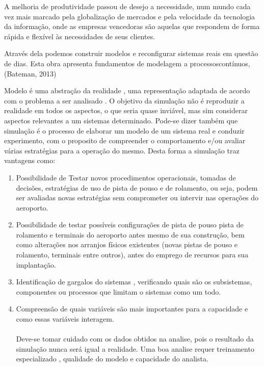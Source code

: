 \documentclass[12pt]{article}
\begin{document}
A melhoria de produtividade passou de desejo a necessidade, num mundo 
cada vez mais marcado pela globalização de mercados e pela velocidade
da tecnologia da informação, onde as empresas vencedoras são aquelas
que respondem de forma rápida e flexível às necessidades de seus clientes. 


Através dela podemos construir modelos e reconfigurar sistemas
reais em questão de dias. Esta obra apresenta fundamentos de modelagem 
a processoscontínuos, (Bateman, 2013)


Modelo é uma abstração da realidade , uma representação adaptada de acordo
com o problema a ser analisado . O objetivo da simulação não é reproduzir
a realidade em todos os aspectos, o que seria quase inviável, mas sim 
considerar aspectos relevantes a um sistemas determinado. Pode-se dizer
também que simulação é o processo de elaborar um modelo de um sistema
real e conduzir experimento, com o proposito de compreender o comportamento
e/ou avaliar várias estratégias para a operação do mesmo. Desta forma a
simulação traz vantagens como:




\begin{enumerate}

\item Possibilidade de Testar novos procedimentos operacionais, tomadas
 de decisões, estratégias de uso de pista de pouso e de rolamento, ou seja,
 podem ser avaliadas novas estratégias sem comprometer ou intervir nas 
 operações do aeroporto.

\item Possibilidade de testar possíveis configurações de pista de pouso
  pista de rolamento e terminais do aeroporto antes mesmo de sua construção, 
  bem como alterações nos arranjos físicos existentes (novas pistas de pouso
  e rolamento, terminais entre outros), antes do emprego de recursos para
  sua implantação.

\item Identificação de gargalos do sistemas , verificando quais são os 
  subsistemas, componentes ou processos que limitam o sistemas como um
  todo.

\item Compreensão de quais variáveis são mais importantes para a capacidade
e como essas variáveis interagem.

\paragraph{}%
Deve-se tomar cuidado com os dados obtidos na analise, pois o resultado 
da simulação nunca será igual a realidade. Uma boa analise requer 
treinamento especializado , qualidade do modelo e capacidade do analista.

\end{enumerate}
\end{document}
